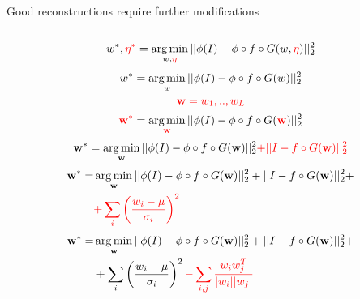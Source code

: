 \begin{frame}{Good reconstructions require further modifications}
\begin{columns}
\begin{column}{0.5\textwidth}
\begin{overprint}
 \begin{equation*} w^*, \mathbin{\textcolor{red}{\eta^*}} = \operatorname*{arg\,min}_{w,\mathbin{\textcolor{red}{\eta}}} || \phi(I) - \phi \circ f \circ G (w, \mathbin{\textcolor{red}{\eta}}) ||_2^2 \end{equation*}
 \begin{equation*} w^* = \operatorname*{arg\,min}_{w} || \phi(I) - \phi \circ f \circ G (w) ||_2^2 \end{equation*}
 $$\mathbin{\textcolor{red}{\textbf{w} = w_1,..,w_L}}$$ \begin{equation*} \mathbin{\textcolor{red}{\textbf{w}^*}} = \operatorname*{arg\,min}_{\mathbin{\textcolor{red}{\textbf{w}}}} || \phi(I) - \phi \circ f \circ G (\mathbin{\textcolor{red}{\textbf{w}}}) ||_2^2 \end{equation*}
 \begin{equation*} \textbf{w}^* = \operatorname*{arg\,min}_{\textbf{w}} || \phi(I) - \phi \circ f \circ G (\textbf{w}) ||_2^2 \mathbin{\textcolor{red}{+ || I - f \circ G (\textbf{w}) ||_2^2}} \end{equation*}
 \begin{equation*} \begin{aligned} \textbf{w}^* = & \operatorname*{arg\,min}_{\textbf{w}} || \phi(I) - \phi \circ f \circ G (\textbf{w}) ||_2^2 + || I - f \circ G (\textbf{w}) ||_2^2 + \\
& \mathbin{\textcolor{red}{ + \sum_i \left(\frac{w_i-\mu}{\sigma_i}\right)^2}} \end{aligned} \end{equation*}
 \begin{equation*} \begin{aligned} \textbf{w}^* = & \operatorname*{arg\,min}_{\textbf{w}} || \phi(I) - \phi \circ f \circ G (\textbf{w}) ||_2^2 + || I - f \circ G (\textbf{w}) ||_2^2 + \\
& + \sum_i \left(\frac{w_i-\mu}{\sigma_i}\right)^2 \mathbin{\textcolor{red}{- \sum_{i,j} \frac{w_iw_j^T}{|w_i| |w_j|}}} \end{aligned} \end{equation*}


\end{overprint}
\end{column}
\end{columns}


\vspace{3em}


\begin{columns}
 \begin{column}{\textwidth}
  



\end{column}
\end{columns}
\end{frame}
